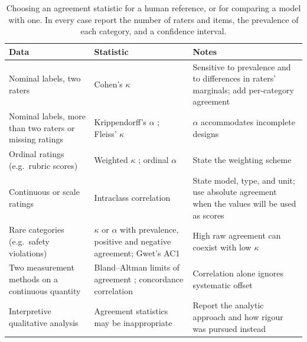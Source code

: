 \begin{table}[t]
\caption{Choosing an agreement statistic for a human reference, or for
comparing a model with one. In every case report the number of raters and
items, the prevalence of each category, and a confidence interval.}
\label{tab:irr}
\small
\begin{tabularx}{\textwidth}{@{}L{3.6cm}L{4.4cm}Y@{}}
\toprule
Data & Statistic & Notes \\
\midrule
Nominal labels, two raters & Cohen's $\kappa$
\cite{cohen1960coefficient} & Sensitive to prevalence and to differences in
raters' marginals; add per-category agreement \\
Nominal labels, more than two raters or missing ratings & Krippendorff's
$\alpha$ \cite{hayes2007answering}; Fleiss' $\kappa$
\cite{fleiss1971measuring} & $\alpha$ accommodates incomplete designs \\
Ordinal ratings (e.g.\ rubric scores) & Weighted $\kappa$
\cite{cohen1968weighted}; ordinal $\alpha$ & State the weighting scheme \\
Continuous or scale ratings & Intraclass correlation
\cite{shrout1979intraclass,koo2016guideline} & State model, type, and unit;
use absolute agreement when the values will be used as scores \\
Rare categories (e.g.\ safety violations) & $\kappa$ or $\alpha$ with
prevalence, positive and negative agreement; Gwet's AC1
\cite{gwet2008computing} & High raw agreement can coexist with low $\kappa$
\cite{feinstein1990high,byrt1993bias} \\
Two measurement methods on a continuous quantity & Bland--Altman limits of
agreement \cite{bland1986statistical}; concordance correlation
\cite{lin1989concordance} & Correlation alone ignores systematic offset \\
Interpretive qualitative analysis & Agreement statistics may be
inappropriate \cite{mcdonald2019reliability,braun2019reflecting} & Report the
analytic approach and how rigour was pursued instead \\
\bottomrule
\end{tabularx}
\end{table}

